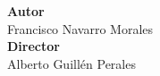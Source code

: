 \begin{titlepage}
\vspace{1.5cm}
\noindent\hspace*{\centeroffset}\begin{minipage}{\textwidth}
\centering

\textbf{Autor}\\ {Francisco Navarro Morales}\\[2.5ex]
\textbf{Director}\\
{Alberto Guillén Perales}\\[2cm]
\end{minipage}

 
\end{titlepage}


